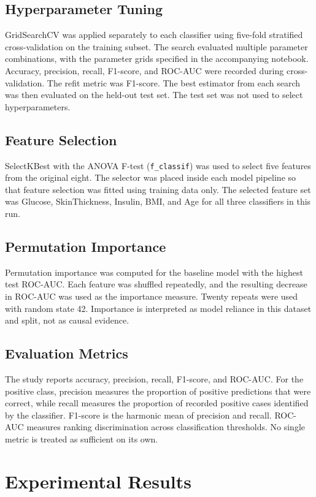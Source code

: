 \documentclass[12pt,a4paper]{article}
\begin{document}
\subsection{Hyperparameter Tuning}
GridSearchCV was applied separately to each classifier using five-fold stratified cross-validation on the training subset. The search evaluated multiple parameter combinations, with the parameter grids specified in the accompanying notebook. Accuracy, precision, recall, F1-score, and ROC-AUC were recorded during cross-validation. The refit metric was F1-score. The best estimator from each search was then evaluated on the held-out test set. The test set was not used to select hyperparameters.

\subsection{Feature Selection}
SelectKBest with the ANOVA F-test (\texttt{f\_classif}) was used to select five features from the original eight. The selector was placed inside each model pipeline so that feature selection was fitted using training data only. The selected feature set was Glucose, SkinThickness, Insulin, BMI, and Age for all three classifiers in this run.

\subsection{Permutation Importance}
Permutation importance was computed for the baseline model with the highest test ROC-AUC. Each feature was shuffled repeatedly, and the resulting decrease in ROC-AUC was used as the importance measure. Twenty repeats were used with random state 42. Importance is interpreted as model reliance in this dataset and split, not as causal evidence.

\subsection{Evaluation Metrics}
The study reports accuracy, precision, recall, F1-score, and ROC-AUC. For the positive class, precision measures the proportion of positive predictions that were correct, while recall measures the proportion of recorded positive cases identified by the classifier. F1-score is the harmonic mean of precision and recall. ROC-AUC measures ranking discrimination across classification thresholds. No single metric is treated as sufficient on its own.

\clearpage
\section{Experimental Results}
\end{document}
